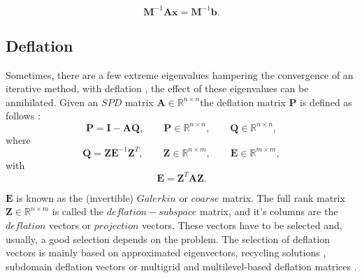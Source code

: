 \documentclass[12pt]{article}
\begin{document}
\begin{equation}\label{eq:precon}
 \mathbf{M}^{-1}\mathbf{A}\mathbf{x}=\mathbf{M}^{-1}\mathbf{b}.
\end{equation}

\subsection*{Deflation}
\hspace{0.5cm} Sometimes, there are a few extreme eigenvalues hampering the convergence of an iterative method, 
with deflation \cite{Vuik99}, the effect of these eigenvalues can be annihilated. 
Given an $SPD$ matrix $\mathbf{A} \in \mathbb{R}^{n \times n}$the deflation matrix $\mathbf{P}$ is defined as follows 
\cite{Tang08,Tang09}:
$$\mathbf{P}=\mathbf{I}-\mathbf{A}\mathbf{Q}, \qquad \mathbf{P} \in \mathbb{R}^{n \times n}, \qquad \mathbf{Q} \in \mathbb{R}^{n \times n},$$
where
$$\mathbf{Q}=\mathbf{Z}\mathbf{E}^{-1}\mathbf{Z}^T, \qquad \mathbf{Z} \in \mathbb{R}^{n \times m}, \qquad \mathbf{E} \in \mathbb{R}^{m \times m}, $$
with
$$\mathbf{E}=\mathbf{Z}^T\mathbf{A}\mathbf{Z}.$$

$\mathbf{E}$ is known as the (invertible) $Galerkin$ or $coarse$ matrix.  
The full rank matrix $\mathbf{Z}\in \mathbb{R}^{n\times m}$ is called the $deflation-subspace$ matrix, and it's columns are the
$deflation$ vectors or $projection$ vectors. 
These vectors have to be selected and, usually, a good selection depends on the problem. 
The selection of deflation vectors is mainly based on approximated eigenvectors, 
recycling solutions \cite{Clemens04,Diaz17}, subdomain deflation vectors \cite{Vuik02} or multigrid and multilevel-based deflation 
matrices \cite{Tang09,Smith96}.
\end{document}
